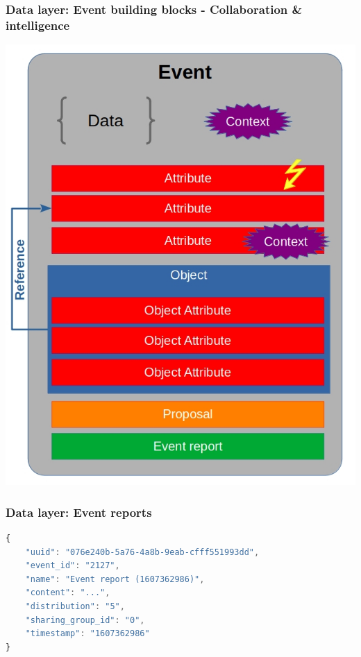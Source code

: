 \begin{frame}
    \frametitle{Data layer: Event building blocks - Collaboration \& intelligence}
        \begin{center}
            \includegraphics[scale=0.33]{screenshots/event-building-blocks/event-attribute-object-proposal.png}
        \end{center}
\end{frame}

\begin{frame}[fragile]
    \frametitle{Data layer: Event reports}
    \begin{lstlisting}[language=javascript,firstnumber=1]
{
    "uuid": "076e240b-5a76-4a8b-9eab-cfff551993dd",
    "event_id": "2127",
    "name": "Event report (1607362986)",
    "content": "...",
    "distribution": "5",
    "sharing_group_id": "0",
    "timestamp": "1607362986"
}
\end{lstlisting}
\end{frame}

